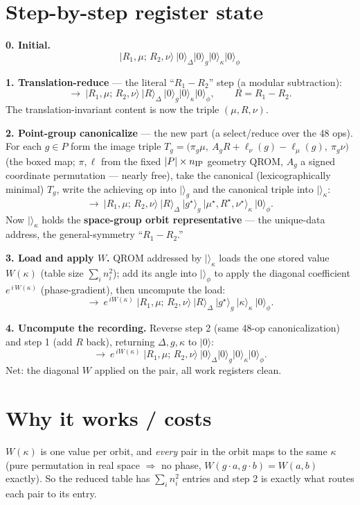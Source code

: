 \documentclass[11pt]{article}
\newcommand{\ket}[1]{\lvert #1\rangle}
\begin{document}
\section*{Step-by-step register state}

\textbf{0. Initial.}
\[ \ket{R_1,\mu;\,R_2,\nu}\ \ket{0}_\Delta\ket{0}_g\ket{0}_\kappa\ket{0}_\phi \]

\textbf{1. Translation-reduce} --- the literal ``$R_1-R_2$'' step (a modular subtraction):
\[ \longrightarrow\ \ket{R_1,\mu;\,R_2,\nu}\ \ket{R}_\Delta\ \ket{0}_g\ket{0}_\kappa\ket{0}_\phi,\qquad R=R_1-R_2. \]
The translation-invariant content is now the triple $(\mu,R,\nu)$.

\textbf{2. Point-group canonicalize} --- the new part (a select/reduce over the 48 ops).
For each $g\in P$ form the image triple $T_g=\big(\pi_g\mu,\ A_gR+\ell_\nu(g)-\ell_\mu(g),\ \pi_g\nu\big)$
(the boxed map; $\pi,\ell$ from the fixed $|P|\times n_{\rm IP}$ geometry QROM, $A_g$ a signed
coordinate permutation --- nearly free), take the canonical (lexicographically minimal) $T_g$, write the
achieving op into $\ket{}_g$ and the canonical triple into $\ket{}_\kappa$:
\[ \longrightarrow\ \ket{R_1,\mu;\,R_2,\nu}\ \ket{R}_\Delta\ \ket{g^\star}_g\ \ket{\mu^\star,R^\star,\nu^\star}_\kappa\ \ket{0}_\phi. \]
Now $\ket{}_\kappa$ holds the \textbf{space-group orbit representative} --- the unique-data address, the
general-symmetry ``$R_1-R_2$.''

\textbf{3. Load and apply $W$.} QROM addressed by $\ket{}_\kappa$ loads the one stored value $W(\kappa)$
(table size $\sum_i n_i^2$); add its angle into $\ket{}_\phi$ to apply the diagonal coefficient
$e^{\,i\,W(\kappa)}$ (phase-gradient), then uncompute the load:
\[ \longrightarrow\ e^{\,iW(\kappa)}\;\ket{R_1,\mu;\,R_2,\nu}\ \ket{R}_\Delta\ \ket{g^\star}_g\ \ket{\kappa}_\kappa\ \ket{0}_\phi. \]

\textbf{4. Uncompute the recording.} Reverse step 2 (same 48-op canonicalization) and step 1 (add $R$
back), returning $\Delta,g,\kappa$ to $\ket{0}$:
\[ \longrightarrow\ e^{\,iW(\kappa)}\;\ket{R_1,\mu;\,R_2,\nu}\ \ket{0}_\Delta\ket{0}_g\ket{0}_\kappa\ket{0}_\phi. \]
Net: the diagonal $W$ applied on the pair, all work registers clean.

\section*{Why it works / costs}
$W(\kappa)$ is one value per orbit, and \emph{every} pair in the orbit maps to the same $\kappa$
(pure permutation in real space $\Rightarrow$ no phase, $W(g\!\cdot\!a,g\!\cdot\!b)=W(a,b)$ exactly). So
the reduced table has $\sum_i n_i^2$ entries and step 2 is exactly what routes each pair to its entry.
\end{document}
